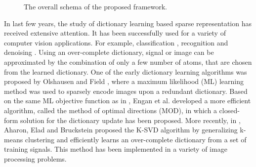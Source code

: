 \documentclass{article}
\begin{document}
\begin{figure*}[t]
\label{fig:fig1}
             \caption{The overall schema of the proposed framework.}
             \end{figure*}

In last few years, the study of dictionary learning based sparse representation has received extensive attention. It has been successfully used for a variety of computer vision applications. For example, classification \cite{huang2006sparse}, recognition \cite{wright2009robust} and denoising \cite{elad2006image}.
 Using an over-complete dictionary, signal or image can be approximated by the combination of only a few number of atoms, that are chosen from the learned dictionary. One of the early dictionary learning algorithms was proposed by Olshausen and Field \cite{olshausen1997sparse}, where a maximum likelihood (ML) learning method was used to sparsely encode images upon a redundant dictionary. Based on the same ML objective function as in \cite{olshausen1997sparse}, Engan et al. \cite{engan1999method} developed a more efficient algorithm, called the method of optimal directions (MOD), in which a closed-form solution for the dictionary update has been proposed. More recently, in \cite{aharon2006svd}, Aharon, Elad and Bruckstein proposed the K-SVD algorithm by generalizing k-means clustering and efficiently learns an over-complete dictionary from a set of training signals. This method has been implemented in a variety of image processing problems.
\end{document}
